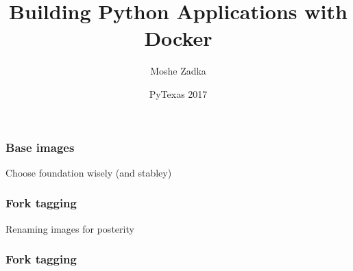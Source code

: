 \documentclass{beamer}
\title{Building Python Applications with Docker}
\author{Moshe Zadka}
\date{PyTexas 2017}
\begin{document}
 
\frame{\titlepage}
 
\begin{frame}
\frametitle{Base images}
Choose foundation wisely (and stabley)
\end{frame}

\begin{frame}
\frametitle{Fork tagging}
Renaming images for posterity
\end{frame}

\begin{frame}[fragile]
\frametitle{Fork tagging}

\end{frame}
\end{document}
